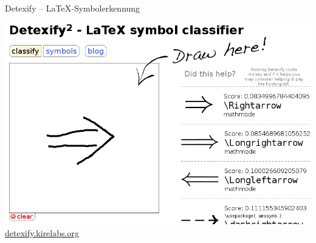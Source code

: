 \documentclass{beamer}
\begin{document}
		
		\begin{frame}{Detexify -- \LaTeX-Symbolerkennung}
		\begin{minipage}[0.5\textheight]{0.5\textwidth}
			\begin{center}
			\includegraphics[height=0.48\textheight]{images/detexify}
			\vspace{0.5cm}
			\Large \href{http://detexify.kirelabs.org/}{detexify.kirelabs.org}
			\end{center}
		\end{minipage}
		\begin{minipage}{0.45\textwidth}
			\begin{center}

\end{center}
\end{minipage}
\end{frame}
\end{document}
